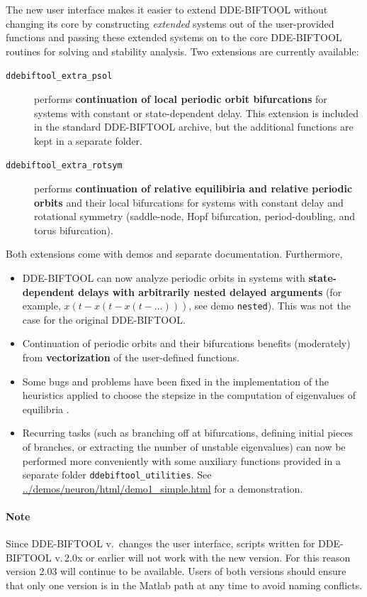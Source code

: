 \documentclass[10pt]{scrartcl}
\newcommand{\DDEBIFCODE}{\textsc{DDE-BIFTOOL}}
\begin{document}
The new user interface makes it easier to extend \DDEBIFCODE{} without
changing its core by constructing \emph{extended} systems out of the
user-provided functions and passing these extended systems on to the
core \DDEBIFCODE{} routines for solving and stability analysis. Two
extensions are currently available:
\begin{description}
\item[\texttt{ddebiftool\_extra\_psol}] performs \textbf{continuation of local
  periodic orbit bifurcations} for systems with constant or
  state-dependent delay. This extension is included in the standard
  \DDEBIFCODE{} archive, but the additional functions are kept in a
  separate folder.
\item[\texttt{ddebiftool\_extra\_rotsym}] performs \textbf{continuation of
  relative equilibiria and relative periodic orbits} and their local
  bifurcations for systems with constant delay and rotational symmetry
  (saddle-node, Hopf bifurcation, period-doubling, and torus
  bifurcation).
\end{description}
Both extensions come with demos and separate documentation.
Furthermore,
\begin{itemize}
\item \DDEBIFCODE{} can now analyze periodic orbits in systems with
  \textbf{state-dependent delays with arbitrarily nested delayed
    arguments} (for example, $x(t-x(t-x(t-\ldots)))$, see demo
  \texttt{nested}). This was not the case for the original
  \DDEBIFCODE{}.
\item Continuation of periodic orbits and their bifurcations benefits
  (moderately) from \textbf{vectorization} of the user-defined functions.
\item Some bugs and problems have been fixed in the implementation of
  the heuristics applied to choose the stepsize in the computation of
  eigenvalues of equilibria \cite{VLR08}.
\item Recurring tasks (such as branching off at bifurcations, defining
  initial pieces of branches, or extracting the number of unstable
  eigenvalues) can now be performed more conveniently with some
  auxiliary functions provided in a separate folder
  \texttt{ddebiftool\_utilities}. See
  \url{../demos/neuron/html/demo1_simple.html} for a demonstration.
\end{itemize}

\paragraph{Note}
Since \DDEBIFCODE{} v.\,\version{} changes the user interface, scripts
written for \DDEBIFCODE{} v.\,2.0x or earlier will not work with the
new version. For this reason version 2.03 will continue to be
available. Users of both versions should ensure that only one version
is in the Matlab path at any time to avoid naming conflicts.
\end{document}
